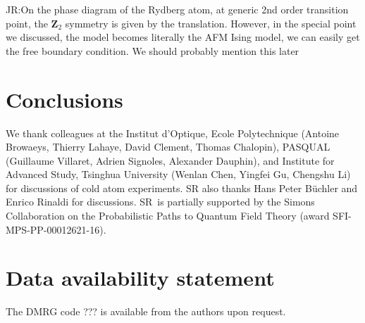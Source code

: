\documentclass[a4paper,11pt]{article}
\theoremstyle{remark}
\theoremstyle{theorem}
\begin{document}
{\color{red}  JR:On the phase diagram of the Rydberg atom, at generic 2nd order transition point, the  $\mathbf{Z}_2$ symmetry is given by the translation. However, in the special point we discussed, the model becomes literally the AFM Ising model, we can easily get the free boundary condition. We should probably mention this later}	



\section{Conclusions}
\label{sec:concl}

\acknowledgments

We thank colleagues at the Institut d'Optique, Ecole Polytechnique (Antoine Browaeys, Thierry Lahaye, David Clement, Thomas Chalopin), PASQUAL (Guillaume Villaret, Adrien Signoles, Alexander Dauphin), and Institute for Advanced Study, Tsinghua University (Wenlan Chen, Yingfei Gu, Chengshu Li) for discussions of cold atom experiments. SR also thanks Hans Peter B\"uchler and Enrico Rinaldi for discussions. SR~is partially supported by the Simons Collaboration on the Probabilistic Paths to Quantum Field Theory (award SFI-MPS-PP-00012621-16). 


\section*{Data availability statement}

The DMRG code ??? is available from the authors upon request. 

\appendix


	

\small
\setlength{\bibsep}{2pt}

\end{document}
